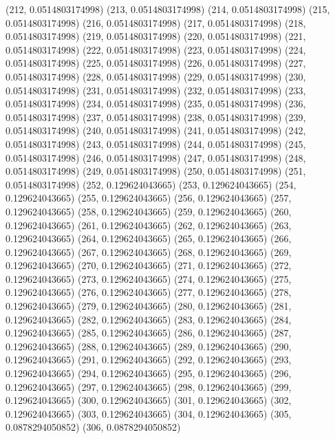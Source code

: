 {					(212, 0.0514803174998)
					(213, 0.0514803174998)
					(214, 0.0514803174998)
					(215, 0.0514803174998)
					(216, 0.0514803174998)
					(217, 0.0514803174998)
					(218, 0.0514803174998)
					(219, 0.0514803174998)
					(220, 0.0514803174998)
					(221, 0.0514803174998)
					(222, 0.0514803174998)
					(223, 0.0514803174998)
					(224, 0.0514803174998)
					(225, 0.0514803174998)
					(226, 0.0514803174998)
					(227, 0.0514803174998)
					(228, 0.0514803174998)
					(229, 0.0514803174998)
					(230, 0.0514803174998)
					(231, 0.0514803174998)
					(232, 0.0514803174998)
					(233, 0.0514803174998)
					(234, 0.0514803174998)
					(235, 0.0514803174998)
					(236, 0.0514803174998)
					(237, 0.0514803174998)
					(238, 0.0514803174998)
					(239, 0.0514803174998)
					(240, 0.0514803174998)
					(241, 0.0514803174998)
					(242, 0.0514803174998)
					(243, 0.0514803174998)
					(244, 0.0514803174998)
					(245, 0.0514803174998)
					(246, 0.0514803174998)
					(247, 0.0514803174998)
					(248, 0.0514803174998)
					(249, 0.0514803174998)
					(250, 0.0514803174998)
					(251, 0.0514803174998)
					(252, 0.129624043665)
					(253, 0.129624043665)
					(254, 0.129624043665)
					(255, 0.129624043665)
					(256, 0.129624043665)
					(257, 0.129624043665)
					(258, 0.129624043665)
					(259, 0.129624043665)
					(260, 0.129624043665)
					(261, 0.129624043665)
					(262, 0.129624043665)
					(263, 0.129624043665)
					(264, 0.129624043665)
					(265, 0.129624043665)
					(266, 0.129624043665)
					(267, 0.129624043665)
					(268, 0.129624043665)
					(269, 0.129624043665)
					(270, 0.129624043665)
					(271, 0.129624043665)
					(272, 0.129624043665)
					(273, 0.129624043665)
					(274, 0.129624043665)
					(275, 0.129624043665)
					(276, 0.129624043665)
					(277, 0.129624043665)
					(278, 0.129624043665)
					(279, 0.129624043665)
					(280, 0.129624043665)
					(281, 0.129624043665)
					(282, 0.129624043665)
					(283, 0.129624043665)
					(284, 0.129624043665)
					(285, 0.129624043665)
					(286, 0.129624043665)
					(287, 0.129624043665)
					(288, 0.129624043665)
					(289, 0.129624043665)
					(290, 0.129624043665)
					(291, 0.129624043665)
					(292, 0.129624043665)
					(293, 0.129624043665)
					(294, 0.129624043665)
					(295, 0.129624043665)
					(296, 0.129624043665)
					(297, 0.129624043665)
					(298, 0.129624043665)
					(299, 0.129624043665)
					(300, 0.129624043665)
					(301, 0.129624043665)
					(302, 0.129624043665)
					(303, 0.129624043665)
					(304, 0.129624043665)
					(305, 0.0878294050852)
					(306, 0.0878294050852)
}
